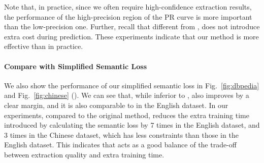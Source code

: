 
Note that, in practice, since we often require high-confidence extraction results, the performance of the high-precision region of the PR curve is more important than the low-precision one.
Further, recall that different from \ILP, \SL does not introduce extra cost during prediction.
These experiments indicate that our \SL method is more effective than \ILP in practice.
\paragraph{Compare with Simplified Semantic Loss}


We also show the performance of our simplified semantic loss in Fig.~\ref{fig:dbpedia} and Fig.~\ref{fig:chinese} (\SLsimple).
We can see that, while inferior to \SL, \SLsimple also improves \base by a clear margin, and it is also comparable to \ILP in the English dataset.
In our experiments, compared to the original \SL method, \SLsimple reduces the extra training time introduced by calculating the semantic loss by 7 times in the English dataset, and 3 times in the Chinese dataset, which has less constraints than those in the English dataset.
This indicates that \SLsimple acts as a good balance of the trade-off between extraction quality and extra training time.



